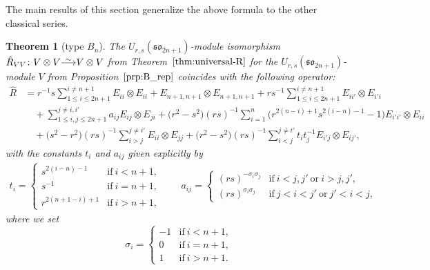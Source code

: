 \documentclass[10pt,a4paper]{amsart}
\numberwithin{equation}{section}
\newtheorem{Theorem}{Theorem}[section]
\newcommand{\sso}{\mathfrak{so}}
\newcommand\iso{ \vphantom{j^{X^2}}\smash{\overset{\sim}{\vphantom{\rule{0pt}{0.20em}}\smash{\longrightarrow}}} }
\begin{document}
The main results of this section generalize the above formula to the other classical series.

\begin{Theorem}[type $B_{n}$]\label{thm:B_RMatrix}
The $U_{r,s}(\sso_{2n+1})$-module isomorphism $\hat{R}_{VV}\colon V \otimes V \iso V \otimes V$ from Theorem~$\ref{thm:universal-R}$ for the $U_{r,s}(\sso_{2n+1})$-module $V$ from Proposition~$\ref{prp:B_rep}$ coincides with the following operator:
\begin{align}
 \hat{R} &{}=
 r^{-1}s \sum_{1\leq i\leq 2n+1}^{i\ne n+1} E_{ii} \otimes E_{ii} +
 E_{n + 1,n + 1} \otimes E_{n + 1,n+1} +
 rs^{-1} \sum_{1\leq i\leq 2n+1}^{i\ne n+1} E_{ii'} \otimes E_{i'i} \nonumber\\
 &\quad{}+ \sum_{1\leq i,j\leq 2n+1}^{j\ne i,i'} a_{ij}E_{ij} \otimes E_{ji} +
 \bigl(r^{2} - s^{2}\bigr)(rs)^{-1} \sum_{i = 1}^{n}\bigl(r^{2(n-i)+1}s^{2(i-n)-1}-1\bigr) E_{i'i'} \otimes E_{ii}\nonumber \\
 &\quad{}+ \bigl(s^{2} - r^{2}\bigr)(rs)^{-1} \sum_{i > j}^{j \neq i'} E_{ii} \otimes E_{jj} +
 \bigl(r^{2} - s^{2}\bigr)(rs)^{-1} \sum_{i < j}^{j \neq i'} t_{i}t_{j}^{-1}E_{i'j} \otimes E_{ij'},\label{eq:B_RMatrix}
\end{align}
with the constants $t_i$ and $a_{ij}$ given explicitly by
\begin{gather}\label{eq:B_coeffs}
 t_{i} =
 \begin{cases}
 s^{2(i - n) - 1} & \text{if}\ i < n + 1, \\
 s^{-1} & \text{if}\ i = n + 1, \\
 r^{2(n +1 - i) + 1} & \text{if}\ i > n + 1,
 \end{cases}\qquad
 a_{ij} =
 \begin{cases}
 (rs)^{-\sigma_{i}\sigma_{j}} & \text{if}\ i < j,j'\ \text{or}\ i > j,j', \\
 (rs)^{\sigma_{i}\sigma_{j}} & \text{if}\ j < i < j'\ \text{or}\ j' < i < j,
 \end{cases}
\end{gather}
where we set
\[
 \sigma_{i} =
 \begin{cases}
 -1 & \text{if}\ i < n + 1, \\
 0 & \text{if}\ i = n+ 1, \\
 1 & \text{if}\ i > n + 1.
 \end{cases}
\]
\end{Theorem}
\end{document}
